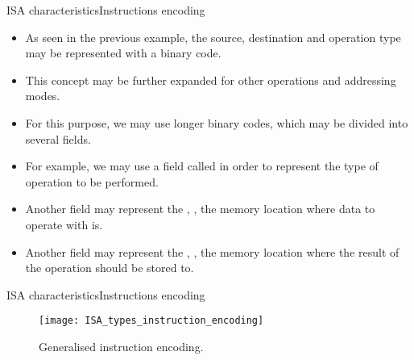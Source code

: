 \begin{frame}{\acs{ISA} characteristics}{Instructions encoding}
  \begin{itemize}
	\item As seen in the previous example, the source, destination and operation type may be represented with a  binary code.
	\item This concept may be further expanded for other operations and addressing modes.
	\item For this purpose, we may use longer binary codes, which may be divided into several fields.
	\item For example, we may use a field called  in order to represent the type of operation to be performed.
	\item Another field may represent the , \ie, the memory location where data to operate with is.
	\item Another field may represent the , \ie, the memory location where the result of the operation should be stored to. 
  \end{itemize}     
\end{frame}

\begin{frame}{\acs{ISA} characteristics}{Instructions encoding}
\vspace{-7pt}
\begin{figure}
\texttt{[image: ISA\_types\_instruction\_encoding]}
\vspace{-2pt}
\caption{Generalised instruction encoding.}
\label{Figure:types_instruction_encoding}
\end{figure}   
\end{frame}

